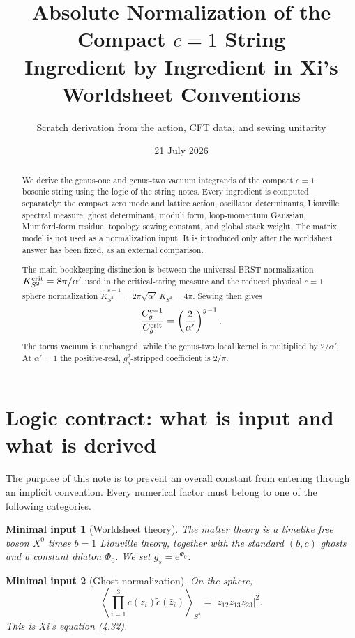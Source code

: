 \documentclass[11pt]{article}
\title{Absolute Normalization of the Compact $c=1$ String\\
Ingredient by Ingredient in Xi's Worldsheet Conventions}
\author{Scratch derivation from the action, CFT data, and sewing unitarity}
\date{21 July 2026}
\numberwithin{equation}{section}
\newcommand{\A}{\alpha'}
\newcommand{\ee}{\mathrm e}
\newcommand{\wh}{\widehat}
\newcommand{\wt}{\widetilde}
\newcommand{\abs}[1]{\left|#1\right|}
\newcommand{\vev}[1]{\left\langle #1\right\rangle}
\newtheorem{minimalinput}{Minimal input}
\begin{document}
\maketitle

\begin{abstract}
We derive the genus-one and genus-two vacuum integrands of the compact $c=1$
bosonic string using the logic of the string notes.  Every ingredient is
computed separately: the compact zero mode and lattice action, oscillator
determinants, Liouville spectral measure, ghost determinant, moduli form,
loop-momentum Gaussian, Mumford-form residue, topology sewing constant, and
global stack weight.  The matrix model is not used as a normalization input.
It is introduced only after the worldsheet answer has been fixed, as an
external comparison.

The main bookkeeping distinction is between the universal BRST normalization
$K_{S^2}^{\rm crit}=8\pi/\A$ used in the critical-string measure and the
reduced physical $c=1$ sphere normalization
$\wh K_{S^2}^{c=1}=2\pi\sqrt{\A}\,\wt K_{S^2}=4\pi$.  Sewing then gives
\[
 \frac{C_g^{c=1}}{C_g^{\rm crit}}
 =\left(\frac{2}{\A}\right)^{g-1}.
\]
The torus vacuum is unchanged, while the genus-two local kernel is multiplied
by $2/\A$.  At $\A=1$ the positive-real, $g_s^2$-stripped coefficient is
$2/\pi$.
\end{abstract}

\tableofcontents

\section{Logic contract: what is input and what is derived}

The purpose of this note is to prevent an overall constant from entering
through an implicit convention.  Every numerical factor must belong to one of
the following categories.

\begin{minimalinput}[Worldsheet theory]
The matter theory is a timelike free boson $X^0$ times $b=1$ Liouville theory,
together with the standard $(b,c)$ ghosts and a constant dilaton $\Phi_0$.
We set $g_s=\ee^{\Phi_0}$.
\end{minimalinput}

\begin{minimalinput}[Ghost normalization]
On the sphere,
\begin{equation}
 \vev{\prod_{i=1}^3c(z_i)\widetilde c(\bar z_i)}_{S^2}
 =\abs{z_{12}z_{13}z_{23}}^2.
 \label{eq:ghost-sphere}
\end{equation}
This is Xi's equation (4.32).
\end{minimalinput}
\end{document}
